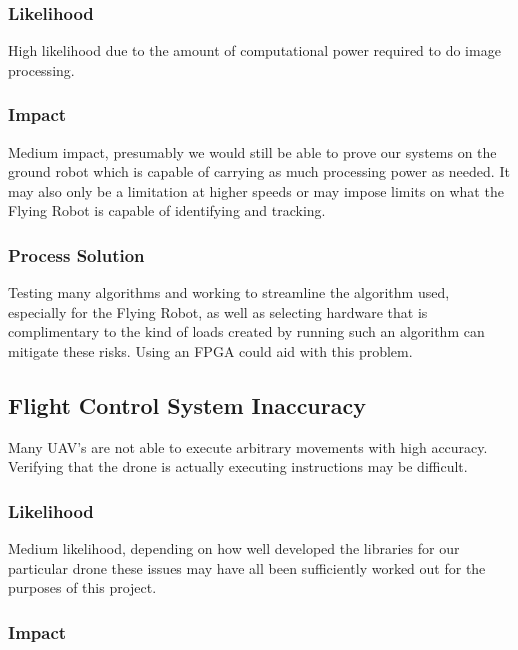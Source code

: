 \documentclass{article}
\begin{document}
		\subsubsection{Likelihood}

		High likelihood due to the amount of computational power required to do image processing. 
		
		\subsubsection{Impact}
		
		Medium impact, presumably we would still be able to prove our systems on the ground robot which is capable of carrying as much processing power as needed. It may also only be a limitation at higher speeds or may impose limits on what the Flying Robot is capable of identifying and tracking. 
		
		\subsubsection{Process Solution}
		
		Testing many algorithms and working to streamline the algorithm used, especially for the Flying Robot, as well as selecting hardware that is complimentary to the kind of loads created by running such an algorithm can mitigate these risks. Using an FPGA could aid with this problem.
	
	\subsection{Flight Control System Inaccuracy}
	
	Many UAV's are not able to execute arbitrary movements with high accuracy. Verifying that the drone is actually executing instructions may be difficult. 
	
		\subsubsection{Likelihood}
		
		Medium likelihood, depending on how well developed the libraries for our particular drone these issues may have all been sufficiently worked out for the purposes of this project.
		
		\subsubsection{Impact}
		
\end{document}
